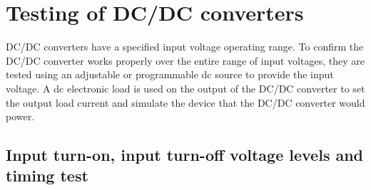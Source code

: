 \section{Testing of DC/DC converters}
DC/DC converters have a specified input voltage operating range. To confirm the DC/DC converter works properly over the entire range of input voltages, they are tested using an adjustable or programmable dc source to provide the input voltage. A dc electronic load is used on the output of the DC/DC converter to set the output load current and simulate the device that the DC/DC converter would power.

\subsection{Input turn-on, input turn-off voltage levels and timing test}

